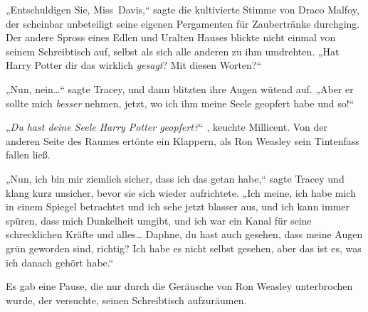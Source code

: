 „Entschuldigen Sie, Miss~Davis,“ sagte die kultivierte Stimme von Draco Malfoy, der scheinbar unbeteiligt seine eigenen Pergamenten für Zaubertränke durchging. Der andere Spross eines Edlen und Uralten Hauses blickte nicht einmal von seinem Schreibtisch auf, selbst als sich alle anderen zu ihm umdrehten. „Hat Harry Potter dir das wirklich \emph{gesagt}? Mit diesen Worten?“

„Nun, nein…“ sagte Tracey, und dann blitzten ihre Augen wütend auf. „Aber er sollte mich \emph{besser} nehmen, jetzt, wo ich ihm meine Seele geopfert habe und so!“

„\emph{Du hast deine Seele Harry Potter geopfert?}“ , keuchte Millicent. Von der anderen Seite des Raumes ertönte ein Klappern, als Ron Weasley sein Tintenfass fallen ließ.

„Nun, ich bin mir ziemlich sicher, dass ich das getan habe,“ sagte Tracey und klang kurz unsicher, bevor sie sich wieder aufrichtete. „Ich meine, ich habe mich in einem Spiegel betrachtet und ich sehe jetzt blasser aus, und ich kann immer spüren, dass mich Dunkelheit umgibt, und ich war ein Kanal für seine schrecklichen Kräfte und alles… Daphne, du hast auch gesehen, dass meine Augen grün geworden sind, richtig? Ich habe es nicht selbst gesehen, aber das ist es, was ich danach gehört habe.“

Es gab eine Pause, die nur durch die Geräusche von Ron Weasley unterbrochen wurde, der versuchte, seinen Schreibtisch aufzuräumen.

